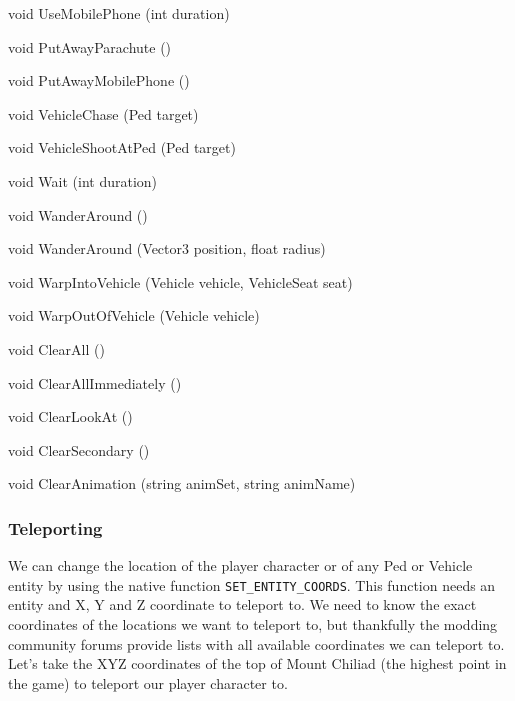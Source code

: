 \documentclass[
  openany]{book}
\newenvironment{Shaded}{\begin{snugshade}}{\end{snugshade}}
\newcommand{\DataTypeTok}[1]{\textcolor[rgb]{0.13,0.29,0.53}{#1}}
\newcommand{\FunctionTok}[1]{\textcolor[rgb]{0.00,0.00,0.00}{#1}}
\newcommand{\NormalTok}[1]{#1}
\begin{document}
\begin{Shaded}
\begin{Highlighting}[]
\DataTypeTok{void} \FunctionTok{UseMobilePhone}\NormalTok{ (}\DataTypeTok{int}\NormalTok{ duration)}
 
\DataTypeTok{void} \FunctionTok{PutAwayParachute}\NormalTok{ ()}
 
\DataTypeTok{void} \FunctionTok{PutAwayMobilePhone}\NormalTok{ ()}
 
\DataTypeTok{void} \FunctionTok{VehicleChase}\NormalTok{ (Ped target)}
 
\DataTypeTok{void} \FunctionTok{VehicleShootAtPed}\NormalTok{ (Ped target)}
 
\DataTypeTok{void} \FunctionTok{Wait}\NormalTok{ (}\DataTypeTok{int}\NormalTok{ duration)}
 
\DataTypeTok{void} \FunctionTok{WanderAround}\NormalTok{ ()}
 
\DataTypeTok{void} \FunctionTok{WanderAround}\NormalTok{ (Vector3 position, }\DataTypeTok{float}\NormalTok{ radius)}
 
\DataTypeTok{void} \FunctionTok{WarpIntoVehicle}\NormalTok{ (Vehicle vehicle, VehicleSeat seat)}
 
\DataTypeTok{void} \FunctionTok{WarpOutOfVehicle}\NormalTok{ (Vehicle vehicle)}
 
\DataTypeTok{void} \FunctionTok{ClearAll}\NormalTok{ ()}
 
\DataTypeTok{void} \FunctionTok{ClearAllImmediately}\NormalTok{ ()}
 
\DataTypeTok{void} \FunctionTok{ClearLookAt}\NormalTok{ ()}
 
\DataTypeTok{void} \FunctionTok{ClearSecondary}\NormalTok{ ()}
 
\DataTypeTok{void} \FunctionTok{ClearAnimation}\NormalTok{ (}\DataTypeTok{string}\NormalTok{ animSet, }\DataTypeTok{string}\NormalTok{ animName)}
\end{Highlighting}
\end{Shaded}

\hypertarget{teleporting}{%
\subsubsection*{Teleporting}\label{teleporting}}

We can change the location of the player character or of any Ped or Vehicle entity by using the native function \texttt{SET\_ENTITY\_COORDS}. This function needs an entity and X, Y and Z coordinate to teleport to.
We need to know the exact coordinates of the locations we want to teleport to, but thankfully the modding community forums provide lists with all available coordinates we can teleport to. Let's take the XYZ coordinates of the top of Mount Chiliad (the highest point in the game) to teleport our player character to.
\end{document}
